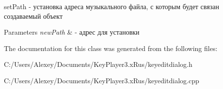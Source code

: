 set\+Path -\/ установка адреса музыкального файла, с которым будет связан создаваемый объект 


\begin{DoxyParams}{Parameters}
{\em new\+Path} & -\/ адрес для установки \\
\hline
\end{DoxyParams}


The documentation for this class was generated from the following files\+:\begin{DoxyCompactItemize}
\item 
C\+:/\+Users/\+Alexey/\+Documents/\+Key\+Player3.\+x\+Rus/keyeditdialog.\+h\item 
C\+:/\+Users/\+Alexey/\+Documents/\+Key\+Player3.\+x\+Rus/keyeditdialog.\+cpp\end{DoxyCompactItemize}
